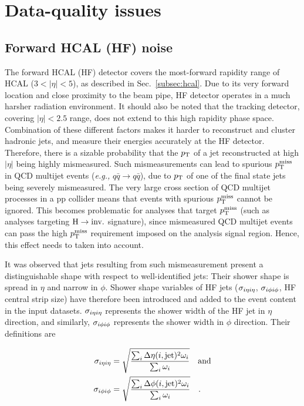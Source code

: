 \section{Data-quality issues}
\label{sec:dataquality}

\subsection{Forward HCAL (HF) noise}
\label{subsec:hfnoise}

The forward HCAL (HF) detector covers the most-forward rapidity range of HCAL ($3 < |\eta| < 5$), as described in
Sec.~\ref{subsec:hcal}. Due to its very forward location and close proximity to the beam pipe, 
HF detector operates in a much harsher radiation environment. 
It should also be noted that the tracking detector, covering $|\eta| < 2.5$ range, does not extend to this high rapidity
phase space. Combination of these different factors makes it harder to reconstruct and cluster hadronic jets, 
and measure their energies accurately at the HF detector. Therefore, there
is a sizable probability that the $p_{\textrm{T}}$ of a jet reconstructed at high $|\eta|$ being highly mismeasured.
Such mismeasurements can lead to spurious $p_{\textrm{T}}^{\textrm{miss}}$ in QCD multijet events (\textit{e.g.,} $q\bar{q} \rightarrow q\bar{q}$),
due to $p_{\textrm{T}}$ of one of the final state jets being severely mismeasured. 
The very large cross section of QCD multijet processes in a pp collider
means that events with spurious $p_{\textrm{T}}^{\textrm{miss}}$ cannot be ignored.
This becomes problematic for analyses that target $p_{\textrm{T}}^{\textrm{miss}}$ (such as analyses targeting $\textrm{H} \rightarrow \textrm{inv.}$ signature), 
since mismeasured QCD multijet events can pass
the high $p_{\textrm{T}}^{\textrm{miss}}$ requirement imposed on the analysis signal region. Hence, this effect needs to taken into account. 

It was observed that jets resulting from such mismeasurement present a distinguishable shape with respect to well-identified jets: 
Their shower shape is spread in $\eta$ and narrow in $\phi$. Shower shape variables of HF jets ($\sigma_{i\eta i\eta}$, $\sigma_{i\phi i\phi}$, HF central strip size) 
have therefore been introduced and added to the event content in the input datasets. 
$\sigma_{i\eta i\eta}$ represents the shower width of the HF jet in $\eta$ direction, and similarly, $\sigma_{i\phi i\phi}$ represents the shower width in $\phi$ direction. 
Their definitions are

\begin{equation}
    \begin{split}
        \sigma_{i\eta i\eta} &= \sqrt{\frac{ \sum_{i} \Delta\eta(i, \mathrm{jet})^2 \omega_i }{ \sum_{i} \omega_i }} \quad \textrm{and} \\
        \sigma_{i\phi i\phi} &= \sqrt{\frac{ \sum_{i} \Delta\phi(i, \mathrm{jet})^2 \omega_i }{ \sum_{i} \omega_i }} \quad .
    \end{split}
    \label{eq:sieie_sipip}
\end{equation}

